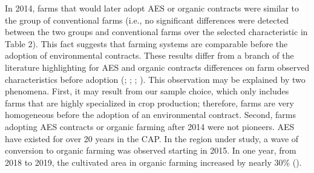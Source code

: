 \begin{Article}
\begin{refsection}[Lassalas]
\begin{table}[!h]
    \vspace{-\baselineskip}

\end{table}

In 2014, farms that would later adopt AES or organic contracts were
similar to the group of conventional farms (i.e., no significant
differences were detected between the two groups and conventional farms
over the selected characteristic in Table 2). This fact suggests that
farming systems are comparable before the adoption of environmental
contracts. These results differ from a branch of the literature
highlighting for AES and organic contracts differences on farm observed
characteristics before adoption (\textcite{mayen_balagtas_alexander_2010}; \textcite{barath2020effect}; \textcite{mennig_sauer_2020}; \textcite{dakpo_latruffe_desjeux_jeanneaux_2022}). This observation may be explained by two phenomena.
First, it may result from our sample choice, which only includes farms that are
highly specialized in crop production; therefore, farms are very
homogeneous before the adoption of an environmental contract. Second,
farms adopting AES contracts or organic farming after 2014 were not
pioneers. AES have existed for over 20 years in the CAP. In the region
under study, a wave of conversion to organic farming was observed
starting in 2015. In one year, from 2018 to 2019, the cultivated area in
organic farming increased by nearly 30\% (\textcite{interbio_2021}).

\newpage


\end{refsection}
\end{Article}
